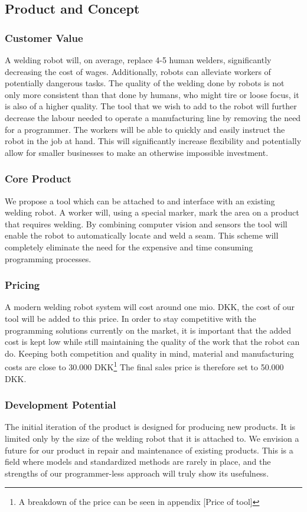 \subsection{Product and Concept}

\subsubsection{Customer Value}
A welding robot will, on average, replace 4-5 human welders, significantly decreasing the cost of wages. Additionally, robots can alleviate workers of potentially dangerous tasks. The quality of the welding done by robots is not only more consistent than that done by humans, who might tire or loose focus, it is also of a higher quality. The tool that we wish to add to the robot will further decrease the labour needed to operate a manufacturing line by removing the need for a programmer. The workers will be able to quickly and easily instruct the robot in the job at hand. This will significantly increase flexibility and potentially allow for smaller businesses to make an otherwise impossible investment.

\subsubsection{Core Product}
We propose a tool which can be attached to and interface with an existing welding robot. 
A worker will, using a special marker, mark the area on a product that requires welding. By combining computer vision and sensors the tool will enable the robot to automatically locate and weld a seam. This scheme will completely eliminate the need for the expensive and time consuming programming processes.

\subsubsection{Pricing}
A modern welding robot system will cost around one mio. DKK, the cost of our tool will be added to this price. In order to stay competitive with the programming solutions currently on the market, it is important that the added cost is kept low while still maintaining the quality of the work that the robot can do. Keeping both competition and quality in mind, material and manufacturing costs are close to 30.000 DKK\footnote{A breakdown of the price can be seen in appendix [Price of tool]} The final sales price is therefore set to 50.000 DKK.

\subsubsection{Development Potential}
The initial iteration of the product is designed for producing new products. It is limited only by the size of the welding robot that it is attached to. We envision a future for our product in repair and maintenance of existing products. This is a field where models and standardized methods are rarely in place, and the strengths of our programmer-less approach will truly show its usefulness.

